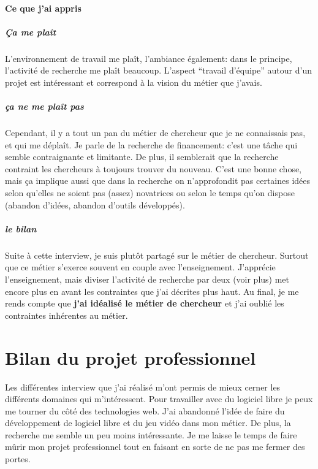 \documentclass[a4paper,12pt, draft]{report}
\begin{document}
\paragraph{Ce que j'ai appris}
\subparagraph{Ça me plaît}
L'environnement de travail me plaît, l'ambiance également: dans le principe, l'activité de recherche me plaît beaucoup. L'aspect ``travail d'équipe'' autour d'un projet est intéressant et correspond à la vision du métier que j'avais.
\subparagraph{ça ne me plaît pas}
Cependant, il y a tout un pan du métier de chercheur que je ne connaissais pas, et qui me déplaît. Je parle de la recherche de financement: c'est une tâche qui semble contraignante et limitante. De plus, il semblerait que la recherche contraint les chercheurs à toujours trouver du nouveau. C'est une bonne chose, mais ça implique aussi que dans la recherche on n'approfondit pas certaines idées selon qu'elles ne soient pas (assez) novatrices ou selon le temps qu'on dispose (abandon d'idées, abandon d'outils développés).

\subparagraph{le bilan}
Suite à cette interview, je suis plutôt partagé sur le métier de chercheur.
Surtout que ce métier s'exerce souvent en couple avec l'enseignement. J'apprécie l'enseignement, mais diviser l'activité de recherche par deux (voir plus) met encore plus en avant les contraintes que j'ai décrites plus haut.
Au final, je me rends compte que \textbf{j'ai idéalisé le métier de chercheur} et j'ai oublié les contraintes inhérentes au métier.

\section{Bilan du projet professionnel}
Les différentes interview que j'ai réalisé m'ont permis de mieux cerner les différents domaines qui m'intéressent. Pour travailler avec du logiciel libre je peux me tourner du côté des technologies web. J'ai abandonné l'idée de faire du développement de logiciel libre et du jeu vidéo dans mon métier. De plus, la recherche me semble un peu moins intéressante. Je me laisse le temps de faire mûrir mon projet professionnel tout en faisant en sorte de ne pas me fermer des portes.
\end{document}
